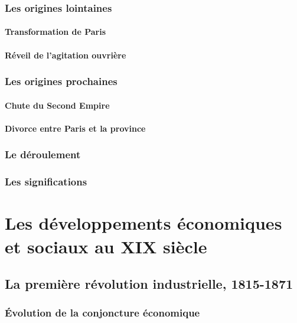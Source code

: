 \documentclass[12pt]{report}
\begin{document}
\subsection{Les origines lointaines}

\subsubsection{Transformation de Paris}

\subsubsection{Réveil de l'agitation ouvrière}

\subsection{Les origines prochaines}

\subsubsection{Chute du Second Empire}

\subsubsection{Divorce entre Paris et la province}

\subsection{Le déroulement}

\subsection{Les significations}


\chapter{Les développements économiques et sociaux au XIX siècle}

\section{La première révolution industrielle, 1815-1871}

\subsection{Évolution de la conjoncture économique}
\end{document}

